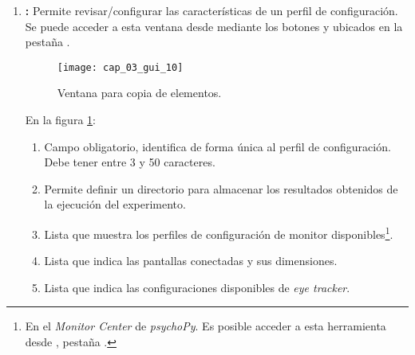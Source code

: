 \documentclass[\main/main.tex]{subfiles}
\begin{document}
\begin{enumerate}
				En la figura \ref{fig:03_gui_com}:
				\begin{enumerate}[(1)]\setlength\itemsep{-0.5em}
					\item Campo obligatorio, identifica de forma única al componente dentro de un cuadro. Debe tener entre 3 y 50 caracteres.
					\item Permite definir el tipo de unidades a utilizar para dibujar el componente.
					\item Tamaño de la figura.
					\item Posición de la figura en el cuadro en base a las unidades de medida seleccionadas.
					\item Permite rotar al componente respecto de su centro.
					\item Selecciona si se trabajará con una figura predeterminada o una imagen.
					\item Permite escoger la figura a utilizar.
					\item Color del relleno y bordes de la figura.
					\item En caso de existir una imagen cargada en el componente esta se muestra en este espacio. Para hacer \textit{zoom} solo es necesario pasar el cursor por encima.
					\item Permite buscar una imagen en el equipo y cargarla en el componente.
					\item Permite eliminar la imagen.
				\end{enumerate}

				\item \textbf{:} Permite revisar/configurar las características de un perfil de configuración. Se puede acceder a esta ventana desde  mediante los botones  y  ubicados en la pestaña .
				\begin{figure}[H]
					\centering
					\texttt{[image: cap\_03\_gui\_10]}
					\caption{Ventana para copia de elementos.}
					\label{fig:03_gui_com}
				\end{figure}

				\vspace{-5mm}

				En la figura \ref{fig:03_gui_com}:
				\begin{enumerate}[(1)]\setlength\itemsep{-0.5em}
					\item Campo obligatorio, identifica de forma única al perfil de configuración. Debe tener entre 3 y 50 caracteres.
					\item Permite definir un directorio para almacenar los resultados obtenidos de la ejecución del experimento.
					\item Lista que muestra los perfiles de configuración de monitor disponibles\footnote{En el \textit{Monitor Center} de \textit{psychoPy}. Es posible acceder a esta herramienta desde , pestaña .}.
					\item Lista que indica las pantallas conectadas y sus dimensiones.
					\item Lista que indica las configuraciones disponibles de \textit{eye tracker}.
				\end{enumerate}


\end{enumerate}
\end{document}
